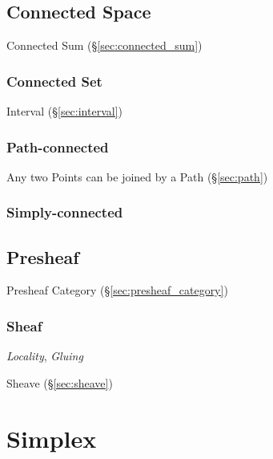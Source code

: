 \subsection{Connected Space}\label{sec:connected_space}

\fist Connected Sum (\S\ref{sec:connected_sum})



\subsubsection{Connected Set}\label{sec:connected_set}

Interval (\S\ref{sec:interval})



\subsubsection{Path-connected}\label{sec:path_connected}

Any two Points can be joined by a Path (\S\ref{sec:path})



\subsubsection{Simply-connected}\label{sec:simply_connected}



\subsection{Presheaf}\label{sec:presheaf}

Presheaf Category (\S\ref{sec:presheaf_category})



\subsubsection{Sheaf}\label{sec:sheaf}

\emph{Locality}, \emph{Gluing}

Sheave (\S\ref{sec:sheave})



\section{Simplex}\label{sec:simplex}


